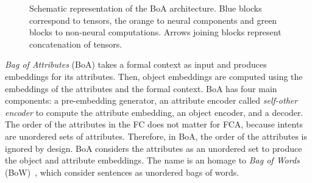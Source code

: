 \begin{figure}
\caption{Schematic representation of the BoA architecture. Blue blocks correspond to tensors, the orange to neural components and green blocks to non-neural computations. Arrows joining blocks represent concatenation of tensors.} \label{fig:boa-architecture}
\end{figure}

\textit{Bag of Attributes} (BoA) takes a formal context as input and produces embeddings for its attributes.
Then, object embeddings are computed using the embeddings of the attributes and the formal context.
BoA has four main components: a pre-embedding generator, an attribute encoder called \textit{self-other encoder} to compute the attribute embedding, an object encoder, and a decoder.
The order of the attributes in the FC does not matter for FCA, because intents are unordered sets of attributes.
Therefore, in BoA, the order of the attributes is ignored by design.
BoA considers the attributes as an unordered set to produce the object and attribute embeddings.
The name is an homage to \textit{Bag of Words} (BoW)~\cite{word2vec:2013:mikolov}, which consider sentences as unordered bags of words.

